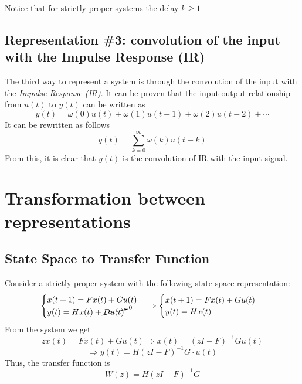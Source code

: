 \begin{remark}
    Notice that for strictly proper systems the delay $k \ge 1$
\end{remark}

\subsection{Representation \#3: convolution of the input with the Impulse Response (IR)}
The third way to represent a system is through the convolution of the input with the \emph{Impulse Response (IR)}.
It can be proven that the input-output relationship from $u(t)$ to $y(t)$ can be written as
\[ y(t) = \omega(0) u(t) + \omega(1) u(t-1) + \omega(2) u(t-2) + \cdots \]
It can be rewritten as follows
\[ y(t) = \sum_{k=0}^{\infty} \omega(k) u(t-k) \]
From this, it is clear that $y(t)$ is the convolution of IR with the input signal.

\section{Transformation between representations}
\subsection{State Space to Transfer Function}
Consider a strictly proper system with the following state space representation:
\[
\begin{cases}
    x(t+1) = F x(t) + G u(t)\\
    y(t) = H x(t) + \cancelto{0}{D u(t)}\\
\end{cases}
\Rightarrow
\begin{cases}
    x(t+1) = F x(t) + G u(t)\\
    y(t) = H x(t)\\
\end{cases}
\]
From the system we get
\[ z x(t) = F x(t) + G u(t) \Rightarrow x(t) = (zI - F)^{-1} G u(t) \]
\[ \Rightarrow y(t) = H (zI - F)^{-1} G \cdot u(t) \]
Thus, the transfer function is
\[ W(z) = H(zI - F) ^ {-1} G \]

